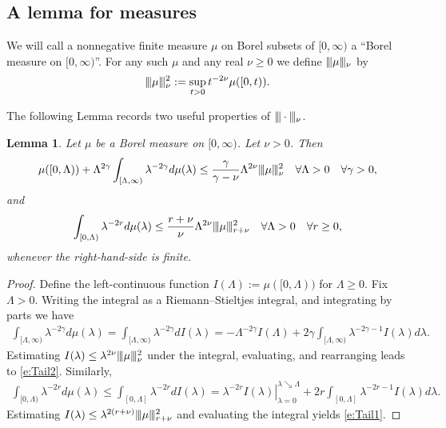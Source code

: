 \documentclass[10pt, a4paper]{iopart}
\newcommand{\normiii}[2]{\vert\kern-0.25ex\vert\kern-0.25ex\vert #1 \vert\kern-0.25ex \vert\kern-0.25ex\vert_{ #2 }}
\newtheorem{lemma}{Lemma}[section]
\theoremstyle{remark}
\theoremstyle{definition}
\begin{document}
\subsection{A lemma for measures}
\label{s:}

We will 
call a nonnegative finite measure $\mu$ on Borel subsets of $[0, \infty)$
a ``Borel measure on $[0, \infty)$''.
%
For any such $\mu$ and any real $\nu \geq 0$
we define
$\normiii{\mu}{\nu}$
by
\begin{align}
	\normiii{\mu}{\nu}^2
	:=
	\sup_{t > 0} t^{-2\nu} \mu([0, t))
	.
\end{align}


The following Lemma 
records
two useful properties of $\normiii{\cdot}{\nu}$.

\begin{lemma}
\label{l:mu}
	Let $\mu$ be a Borel measure on $[0, \infty)$.
	Let $\nu > 0$.
	Then
	\begin{align}
	\label{e:Tail2}
		\mu([0, \Lambda))
		+
		\Lambda^{2 \gamma}
		\int_{[\Lambda, \infty)}
		\lambda^{-2 \gamma}
		d\mu(\lambda)
		\leq
		\frac{\gamma}{\gamma - \nu}
		\Lambda^{2 \nu}
		\normiii{\mu}{\nu}^2
		\quad
		\forall \Lambda > 0
		\quad
		\forall \gamma > 0
		,
	\end{align}
	and
	\begin{align}
	\label{e:Tail1}
		\int_{[0, \Lambda)} \lambda^{-2 r} d\mu(\lambda)
	\leq
		\frac{r + \nu}{\nu}
		\Lambda^{2 \nu}
		\normiii{\mu}{r + \nu}^2
	\quad
		\forall \Lambda > 0
		\quad
		\forall r \geq 0
		,
	\end{align}
	whenever the right-hand-side is finite.
\end{lemma}

\begin{proof}
	Define the left-continuous function
	$I(\Lambda) := \mu([0, \Lambda))$
	for $\Lambda \geq 0$.
	Fix $\Lambda > 0$.
	Writing the integral as a Riemann--Stieltjes integral, 
	and 
	integrating by parts we have
	\begin{align}
		\int_{[\Lambda, \infty)}
		\lambda^{-2 \gamma}
		d\mu(\lambda)
		=
		\int_{[\Lambda, \infty)}
		\lambda^{-2 \gamma}
		d I(\lambda)
		=
		-\Lambda^{-2 \gamma} I(\Lambda) 
		+
		2 \gamma
		\int_{[\Lambda, \infty)}
		\lambda^{-2 \gamma - 1}
		I(\lambda)
		d \lambda
		.
	\end{align}
	Estimating 
	$I(\lambda) \leq \lambda^{2 \nu} \normiii{\mu}{\nu}^2$ 
	under the integral,
	evaluating,
	and rearranging
	leads to \eqref{e:Tail2}.
	Similarly,
	\begin{align}
		\int_{[0, \Lambda)}
		\lambda^{-2 r}
		d \mu(\lambda)
	\leq
		\int_{[0, \Lambda]} 
		\lambda^{-2 r}
		d I(\lambda)
	=
		\left. 
			\lambda^{-2 r} I(\lambda) 
		\right|_{\lambda = 0}^{\lambda \searrow \Lambda}
		+
		2 r
		\int_{[0, \Lambda]}
		\lambda^{-2 r - 1}
		I(\lambda)
		d \lambda
		.
	\end{align}
	Estimating $I(\lambda) \leq \lambda^{2 (r + \nu)} \normiii{\mu}{r + \nu}^2$
	and evaluating the integral yields \eqref{e:Tail1}.
\end{proof}
\end{document}
